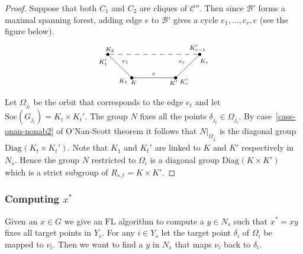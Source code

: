 \documentclass[11pt]{madras}%
\theoremstyle{remark}
\newcommand{\pr}[2]{{\ensuremath{\left.{#1}\right\vert_{#2}}}}
\newcommand{\Soc}[1]{{\ensuremath{\mathrm{Soc}\left(#1\right)}}}
\newcommand{\Diag}[2][]{{\ensuremath{\mathrm{Diag}_{{#1}}\left(#2\right)}}}
\begin{document}
\begin{proof}
  Suppose that both $C_1$ and $C_2$ are cliques of $\mathcal{C}''$.
  Then since $\mathcal{B}'$ forms a maximal spanning forest, adding
  edge $e$ to $\mathcal{B'}$ gives a cycle $e_1,\ldots,e_{r}, e$ (see
  the figure below).
  \[
  \xymatrix@M=0pt@W=0pt{ 
    \bullet \ar@{--}[rrrr]^<{K_2}
    \ar@{}[rrrr]^>{K_{r-1}'}
    & & & & 
    \bullet \ar@{-}[dl]_{e_r} \ar@{}[dl]^<{K_r} \ar@{}[dl]^>{K_r'}\\
    & \bullet \ar@{-}[ul]_{e_1} \ar@{}[ul]^<{K_1} \ar@{}[ul]^>{K_1'}
    \ar@{}[rr]_<K & &  \bullet \ar@{}[ll]^<{K'} \ar@{-}[ll]_e }
  \]
  
  Let $\Omega_{j_t}$ be the orbit that corresponds to the edge $e_t$
  and let $\Soc{G_{j_t}} = K_t \times K_t'$. The group $N$ fixes all
  the points $\delta_{j_t} \in \Omega_{j_t}$.  By
  case~\ref{case-onan-nonab2} of O'Nan-Scott theorem it follows that
  $\pr{N}{\Omega_{j_t}}$ is the diagonal group $\Diag{K_t \times
    K_t'}$. Note that $K_1$ and $K_t'$ are linked to $K$ and $K'$
  respectively in $N_s$. Hence the group $N$ restricted to $\Omega_i$
  is a diagonal group $\Diag{K \times K'}$ which is a strict subgroup
  of $R_{s,t} = K \times K'$.
\end{proof}


\subsubsection{Computing $x^*$} 

Given an $x \in G$ we give an $\mathrm{FL}$ algorithm to compute a $y
\in N_s$ such that $x^* = x y$ fixes all target points in $Y_s$.  For
any $i \in Y_s$ let the target point $\delta_i$ of $\Omega_i$ be mapped
to $\nu_i$. Then we want to find a $y$ in $N_s$ that maps $\nu_i$ back
to $\delta_i$.
\end{document}
